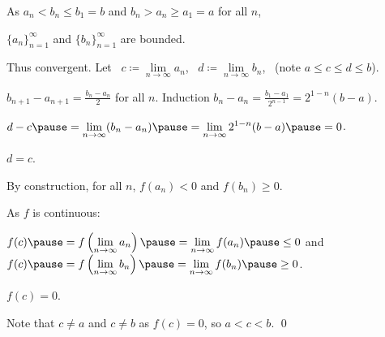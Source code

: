 \documentclass[10pt,aspectratio=169]{beamer}
\begin{document}
\begin{frame}
As $a_n < b_n \leq b_1 = b$ and 
$b_n > a_n \geq a_1 = a$ for all $n$,

\pause
$\{a_n\}_{n=1}^\infty$ and $\{ b_n \}_{n=1}^\infty$ are bounded.

\pause
\medskip

Thus convergent. Let ~$c \coloneqq \lim\limits_{n\to\infty} a_n$,~
$d \coloneqq \lim\limits_{n\to\infty} b_n$,
~(note $a \leq c \leq d \leq b$).

\pause
\medskip

$b_{n+1} - a_{n+1} = \frac{b_n-a_n}{2}$ for all $n$.
\pause
\qquad 
Induction \wthus
$b_n - a_n
= \frac{b_1-a_1}{2^{n-1}}
= 2^{1-n} (b-a)$.

\pause
\medskip

$\displaystyle
d-c
\pause
= \lim_{n\to\infty} (b_n - a_n)
\pause
=
\lim_{n\to\infty} 2^{1-n} (b-a)
\pause
= 0$.

\pause
\medskip

\thus \quad $d=c$.

\pause
\medskip

By construction, for all $n$, \quad
$f(a_n) < 0$ \quad and \quad $f(b_n) \geq 0$.

\pause
\medskip

As $f$ is continuous:

\medskip

$f(c)
\pause
=
f\left(\lim\limits_{n\to\infty} a_n\right)
\pause
=
\lim\limits_{n\to\infty} f(a_n)
\pause
\leq 0$
\pause
\qquad and \qquad
$f(c)
\pause
=
f\left(\lim\limits_{n\to\infty} b_n\right)
\pause
=
\lim\limits_{n\to\infty} f(b_n)
\pause
\geq 0$.

\pause
\medskip

\thus \quad $f(c) = 0$.

\pause
\medskip

Note that $c \not=a$ and $c \not= b$ as $f(c)=0$, \quad so $a < c < b$.  \qed
\end{frame}
\end{document}
